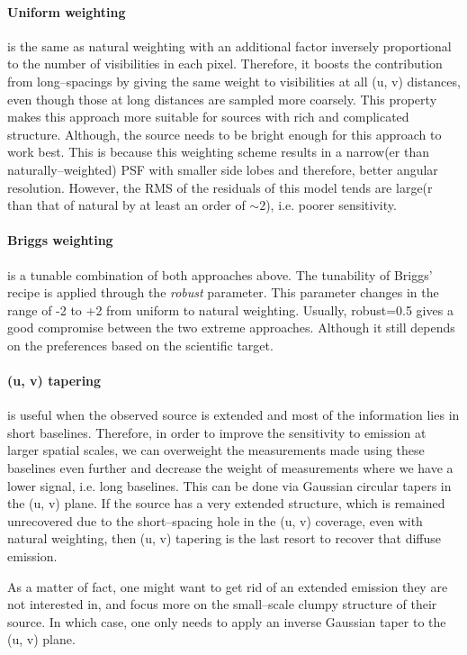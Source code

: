 \documentclass[a4wide,12pt]{book}
\begin{document}
\paragraph*{Uniform weighting} is the same as natural weighting with an additional factor inversely proportional to the number of visibilities in each pixel. Therefore, it boosts the contribution from long--spacings by giving the same weight to visibilities at all (u, v) distances, even though those at long distances are sampled more coarsely. This property makes this approach more suitable for sources with rich and complicated structure. Although, the source needs to be bright enough for this approach to work best. This is because this weighting scheme results in a narrow(er than naturally--weighted) PSF with smaller side lobes and therefore, better angular resolution. However, the RMS of the residuals of this model tends are large(r than that of natural by at least an order of $\sim 2$), i.e. poorer sensitivity.

\paragraph*{Briggs weighting} is a tunable combination of both approaches above. The tunability of Briggs' recipe is applied through the \emph{robust} parameter. This parameter changes in the range of -2 to +2 from uniform to natural weighting. Usually, robust=0.5 gives a good compromise between the two extreme approaches. Although it still depends on the preferences based on the scientific target.

\paragraph*{(u, v) tapering} is useful when the observed source is extended and most of the information lies in short baselines. Therefore, in order to improve the sensitivity to emission at larger spatial scales, we can overweight the measurements made using these baselines even further and decrease the weight of measurements where we have a lower signal, i.e. long baselines. This can be done via Gaussian circular tapers in the (u, v) plane. If the source has a very extended structure, which is remained unrecovered due to the short--spacing hole in the (u, v) coverage, even with natural weighting, then (u, v) tapering is the last resort to recover that diffuse emission. 

As a matter of fact, one might want to get rid of an extended emission they are not interested in, and focus more on the small--scale clumpy structure of their source. In which case, one only needs to apply an inverse Gaussian taper to the (u, v) plane.
\end{document}
